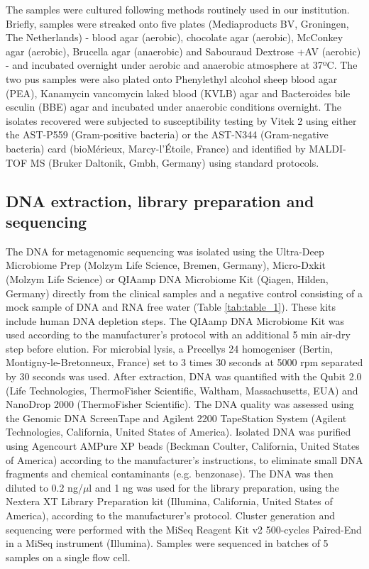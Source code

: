 The samples were cultured following methods routinely used in our institution. 
Briefly, samples were streaked onto five plates (Mediaproducts BV, Groningen, The Netherlands) - blood agar (aerobic), chocolate agar (aerobic), McConkey agar (aerobic), Brucella agar (anaerobic) and Sabouraud Dextrose +AV (aerobic) - and incubated overnight under aerobic and anaerobic atmosphere at 37ºC. 
The two pus samples were also plated onto Phenylethyl alcohol sheep blood agar (PEA), Kanamycin vancomycin laked blood (KVLB) agar and Bacteroides bile esculin (BBE) agar and incubated under anaerobic conditions overnight. 
The isolates recovered were subjected to susceptibility testing by Vitek 2 using either the AST-P559 (Gram-positive bacteria) or the AST-N344 (Gram-negative bacteria) card (bioMérieux, Marcy-l'Étoile, France) and identified by MALDI-TOF MS (Bruker Daltonik, Gmbh, Germany) using standard protocols. 

\subsection{DNA extraction, library preparation and sequencing} \label{ssec:sample_sequencing}

The DNA for metagenomic sequencing was isolated using the Ultra-Deep Microbiome Prep (Molzym Life Science, Bremen, Germany), Micro-Dx\texttrademark kit (Molzym Life Science) or QIAamp DNA Microbiome Kit (Qiagen, Hilden, Germany) directly from the clinical samples and a negative control consisting of a mock sample of DNA and RNA free water (Table \ref{tab:table_1}). 
These kits include human DNA depletion steps. 
The QIAamp DNA Microbiome Kit was used according to the manufacturer’s protocol with an additional 5 min air-dry step before elution. 
For microbial lysis, a Precellys 24 homogeniser (Bertin, Montigny-le-Bretonneux, France) set to 3 times 30 seconds at 5000 rpm separated by 30 seconds was used. 
After extraction, DNA was quantified with the Qubit 2.0 (Life Technologies, ThermoFisher Scientific, Waltham, Massachusetts, EUA) and NanoDrop 2000 (ThermoFisher Scientific). 
The DNA quality was assessed using the Genomic DNA ScreenTape and Agilent 2200 TapeStation System (Agilent Technologies, California, United States of America). 
Isolated DNA was purified using Agencourt AMPure XP beads (Beckman Coulter, California, United States of America) according to the manufacturer’s instructions, to eliminate small DNA fragments and chemical contaminants (e.g. benzonase). 
The DNA was then diluted to 0.2 ng/$\mu$l and 1 ng was used for the library preparation, using the Nextera XT Library Preparation kit (Illumina, California, United States of America), according to the manufacturer’s protocol. 
Cluster generation and sequencing were performed with the MiSeq Reagent Kit v2 500-cycles Paired-End in a MiSeq instrument (Illumina). 
Samples were sequenced in batches of 5 samples on a single flow cell.

